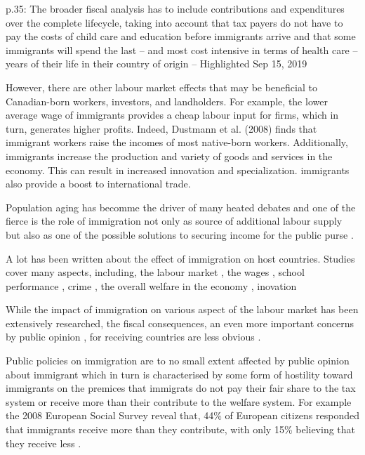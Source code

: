 p.35: The broader fiscal analysis has to include contributions and expenditures over the complete lifecycle, taking into account that tax payers do not have to pay the costs of child care and education before immigrants arrive and that some immigrants will spend the last – and most cost intensive in terms of health care – years of their life in their country of origin -- Highlighted Sep 15, 2019

However, there are other labour market effects that may be beneficial to Canadian-born workers, investors, and landholders. For example, the lower average wage of immigrants provides a cheap labour input for firms, which in turn, generates higher profits. Indeed, Dustmann et al. (2008) finds that immigrant workers raise the incomes of most native-born workers. Additionally, immigrants increase the production and variety of goods and services in the economy. This can result in increased innovation and specialization. immigrants also provide a boost to international trade. \citep{Javdani:2013gu}


Population aging has becomme the driver of many heated debates and one of the fierce is the role of immigration not only as source of additional labour supply but also as one of the possible solutions to securing income for the public purse \citep{Hansen:2017uz}.


  A lot has been written about the effect of immigration on host countries. Studies cover many aspects, including, the labour market \citep{Borjas:2003cr,Dustmann:2016by}, the wages \citep{Dustmann:2013hk,Eberhard:2012te},  school performance \citep{Brunello:2013cy}, crime \citep{Chalfin:2015fb}, the overall welfare in the economy \citep{Ileri:2019hf,Akin:gh,Dungan:2013jp,Fougere:2011ht}, inovation \citep{Hunt:2008fn,Partridge:2008up}



  While the impact of immigration on various aspect of the labour market has been extensively researched, the fiscal consequences, an even more important concerns by public opinion \citep{Dustmann:2014dr}, for receiving countries are less obvious \citep{Preston:2014uw}.

  Public policies on immigration are to no small extent affected by public opinion about immigrant which in turn is characterised by some form of hostility toward immigrants on the premices that immigrats do not pay their fair share to the tax system or receive more than their contribute to the welfare system\citep{Dustmann:2007fl}. For example the 2008 European Social Survey reveal that, 44\% of European citizens responded that immigrants receive more than they contribute, with only 15\% believing that they receive less \citep{Dustmann:2014dr}.

